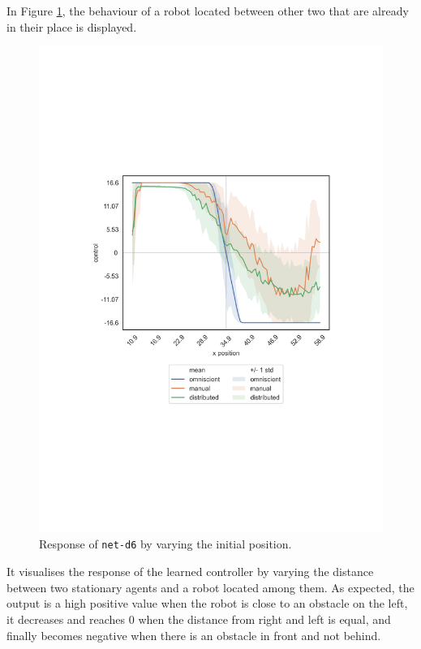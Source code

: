 In Figure \ref{fig:net-d6responseposition}, the behaviour of a robot 
located between other two that are already in their place is displayed.
\begin{figure}[!htb]
	\centering
	\includegraphics[width=.45\textwidth]{contents/images/net-d6/response-varying_init_position-distributed}%
	\caption{Response of \texttt{net-d6} by varying the initial position.}
	\label{fig:net-d6responseposition}
\end{figure}
It visualises the response of the learned controller by varying the distance 
between two stationary agents and a robot located among them.
As expected, the output is a high positive value when the robot is close to an 
obstacle on the left, it decreases and reaches $0$ when the distance from 
right and left is equal, and finally becomes negative when there is an obstacle in 
front and not behind. 

